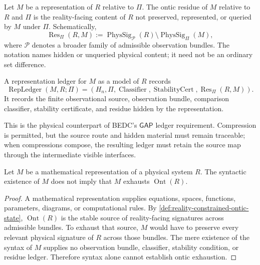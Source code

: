 \begin{definition}
\label{def:ontic-residue}
Let $M$ be a representation of $R$ relative to $\Pi$. The ontic residue of $M$ relative to $R$ and $\Pi$ is the reality-facing content of $R$ not preserved, represented, or queried by $M$ under $\Pi$. Schematically,
$$
\operatorname{Res}_{\Pi}(R,M)
:=
\operatorname{PhysSig}_{\mathcal P}(R)
\setminus
\operatorname{PhysSig}_{\Pi}(M),
$$
where $\mathcal P$ denotes a broader family of admissible observation bundles. The notation names hidden or unqueried physical content; it need not be an ordinary set difference.
\end{definition}

\begin{definition}
\label{def:representation-ledger}
A representation ledger for $M$ as a model of $R$ records
$$
\operatorname{RepLedger}(M,R;\Pi)
=
(H_n,\Pi,\operatorname{Classifier},\operatorname{StabilityCert},
\operatorname{Res}_{\Pi}(R,M)).
$$
It records the finite observational source, observation bundle, comparison classifier, stability certificate, and residue hidden by the representation.
\end{definition}

This is the physical counterpart of BEDC's $\mathsf{GAP}$ ledger requirement. Compression is permitted, but the source route and hidden material must remain traceable; when compressions compose, the resulting ledger must retain the source map through the intermediate visible interfaces.

\begin{theorem}
\label{thm:syntax-does-not-exhaust-ontic-state}
Let $M$ be a mathematical representation of a physical system $R$. The syntactic existence of $M$ does not imply that $M$ exhausts $\operatorname{Ont}(R)$.
\end{theorem}

\begin{proof}
A mathematical representation supplies equations, spaces, functions, parameters, diagrams, or computational rules. By \autoref{def:reality-constrained-ontic-state}, $\operatorname{Ont}(R)$ is the stable source of reality-facing signatures across admissible bundles. To exhaust that source, $M$ would have to preserve every relevant physical signature of $R$ across those bundles. The mere existence of the syntax of $M$ supplies no observation bundle, classifier, stability condition, or residue ledger. Therefore syntax alone cannot establish ontic exhaustion.
\end{proof}


